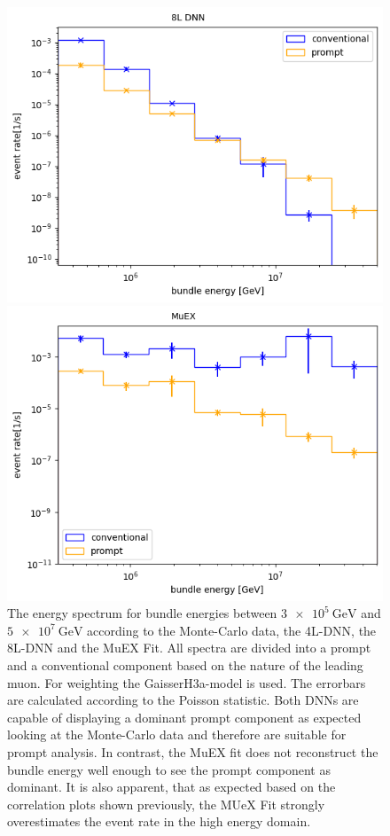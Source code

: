 \documentclass[
  tucolor,       %
  BCOR=12mm,     %
  parskip=half,  %
  open=any,      %
  cleardoublepage=plain,  %
]{tudothesis}
\begin{document}
\begin{figure}
\begin{minipage}[t]{0.49\textwidth}
    \includegraphics[width=\textwidth]{Plots/muon flux std dnn bundle}
  \end{minipage}
  \begin{minipage}[t]{0.49\textwidth}
    \includegraphics[width=\textwidth]{Plots/muon flux MuEX}
  \end{minipage}
  \caption{The energy spectrum for bundle energies between $\SI{3e5}{\giga\electronvolt}$ and $\SI{5e7}{\giga\electronvolt}$ according to the Monte-Carlo data, the 4L-DNN, the 8L-DNN and the MuEX Fit. All spectra are divided into a prompt and a conventional component based on the nature of the leading muon. For weighting the GaisserH3a-model is used. The errorbars are calculated according to the Poisson statistic. Both DNNs are capable of displaying a dominant prompt component as expected looking at the Monte-Carlo data and therefore are suitable for prompt analysis. In contrast, the MuEX fit does not reconstruct the bundle energy well enough to see the prompt component as dominant. It is also apparent, that as expected based on the correlation plots shown previously, the MUeX Fit strongly overestimates the event rate in the high energy domain.}
  \label{fig:Energy spectrum DNNs}
\end{figure}
\end{document}
